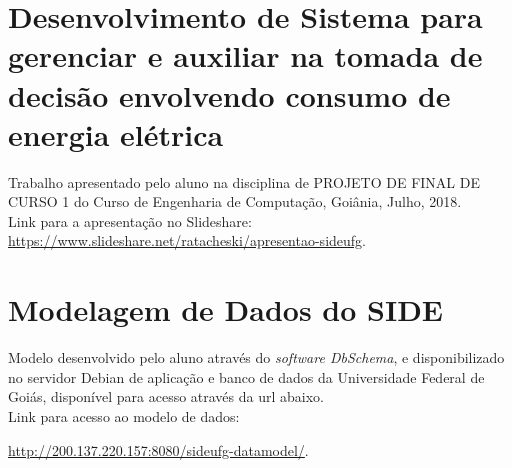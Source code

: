 \begin{apendicesenv}

\partapendices

\chapter{Desenvolvimento de Sistema para gerenciar e auxiliar na tomada de decisão envolvendo consumo de energia elétrica} \label{a:PFC1}

Trabalho apresentado pelo aluno {\imprimirautor} na disciplina de PROJETO DE FINAL DE CURSO 1 do Curso de Engenharia de Computação, Goiânia, Julho, 2018.\\

Link para a apresentação no Slideshare: \url{https://www.slideshare.net/ratacheski/apresentao-sideufg}.

\chapter{Modelagem de Dados do SIDE} \label{a:modelo-dados-side}

Modelo desenvolvido pelo aluno {\imprimirautor} através do \textit{software DbSchema}, e disponibilizado no servidor Debian de aplicação e banco de dados da Universidade Federal de Goiás, disponível para acesso através da url abaixo.\\

Link para acesso ao modelo de dados:

\url{http://200.137.220.157:8080/sideufg-datamodel/}.

\end{apendicesenv}
